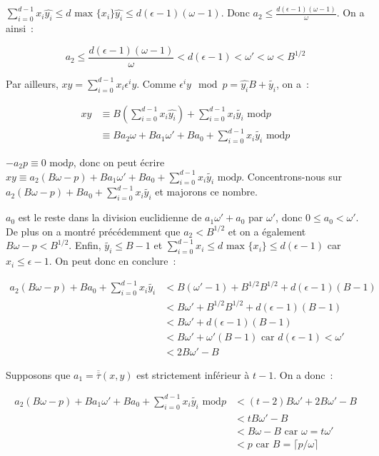     $\sum_{i=0}^{d-1} x_i \hat{y_i} \leq d \text{\ max }\{x_i\} \hat{y_i} \leq d(\epsilon - 1)(\omega - 1)$. Donc $a_2 \leq \frac{d(\epsilon - 1)(\omega - 1)}{\omega}$. On a ainsi~:

    $$a_2 \leq \frac{d(\epsilon - 1)(\omega - 1)}{\omega} < d(\epsilon - 1) < \omega' < \omega < B^{1/2} $$

    Par ailleurs, $xy = \sum_{i=0}^{d-1} x_i \epsilon^i y$. Comme $\epsilon^i y\mod p = \hat{y_i} B + \tilde{y_i}$, on a~:

    \begin{align*}
        xy &\equiv B(\sum_{i=0}^{d-1} x_i \hat{y_i}) + \sum_{i=0}^{d-1} x_i \tilde{y_i} \text{\ mod} p \\
           &\equiv B a_2\omega + B a_1\omega' + B a_0 + \sum_{i=0}^{d-1} x_i \tilde{y_i} \text{\ mod} p
    \end{align*}

    $-a_2 p \equiv 0 \text{\ mod} p$, donc on peut écrire $xy \equiv a_2(B\omega - p) + B a_1\omega' + B a_0 + \sum_{i=0}^{d-1} x_i \tilde{y_i} \text{\ mod} p$. Concentrons-nous sur $a_2(B\omega - p) + B a_0 + \sum_{i=0}^{d-1} x_i \tilde{y_i}$ et majorons ce nombre.

    $a_0$ est le reste dans la division euclidienne de $a_1\omega' + a_0$ par $\omega'$, donc $0 \leq a_0 < \omega'$. De plus on a montré précédemment que $a_2 < B^{1/2}$ et on a également $B\omega - p < B^{1/2}$. Enfin, $\tilde{y_i} \leq B - 1$ et $\sum_{i=0}^{d-1} x_i \leq d \text{\ max $\{x_i\}$} \leq d(\epsilon - 1)$ car $x_i \leq \epsilon - 1$. On peut donc en conclure~:

    \begin{align*}
    a_2(B\omega - p) + B a_0 + \sum_{i=0}^{d-1} x_i \tilde{y_i} &< B(\omega' - 1) + B^{1/2}B^{1/2} + d(\epsilon - 1)(B - 1) \\
                            &< B\omega' + B^{1/2}B^{1/2} + d(\epsilon - 1)(B - 1) \\
                            &< B\omega' + d(\epsilon - 1)(B - 1) \\
                            &< B\omega' + \omega'(B - 1) \text{\ car $d(\epsilon - 1) < \omega'$} \\
                            &< 2B\omega' - B
    \end{align*}

    Supposons que $a_1 = \overline{\overline{\tau}}(x,y)$ est strictement inférieur à $t - 1$. On a donc~:

    \begin{align*}
    a_2(B\omega - p) + B a_1\omega' + B a_0 + \sum_{i=0}^{d-1} x_i \tilde{y_i} \text{\ mod} p &< (t - 2)B\omega' + 2B\omega' - B \\
                          &< tB\omega' - B \\
                          &< B\omega - B \text{\ car $\omega = t\omega'$} \\
                          &< p \text{\ car $B = \lceil p/\omega \rceil$}
    \end{align*}

